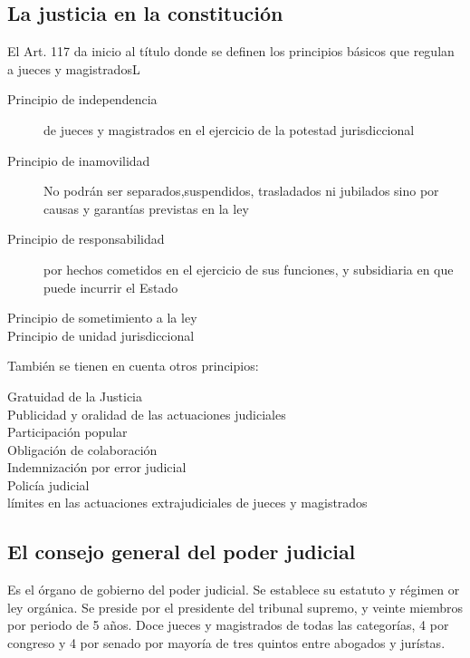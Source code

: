 \subsection{La justicia en la constitución} %
    El Art. 117 da inicio al título donde se definen los principios básicos que regulan a jueces y magistradosL
    \begin{description}
        \item[Principio de independencia] de jueces y magistrados en el ejercicio de la potestad jurisdiccional
        \item[Principio de inamovilidad] No podrán ser separados,suspendidos, trasladados ni jubilados sino por causas y garantías previstas en la ley
        \item[Principio de responsabilidad] por hechos cometidos en el ejercicio de sus funciones, y subsidiaria en que puede incurrir el Estado
        \item[Principio de sometimiento a la ley]
        \item[Principio de unidad jurisdiccional] 
    \end{description}

    También se tienen en cuenta otros principios:
    \begin{description}
        \item[Gratuidad de la Justicia]
        \item[Publicidad y oralidad de las actuaciones judiciales]
        \item[Participación popular]
        \item[Obligación de colaboración]
        \item[Indemnización por error judicial]
        \item[Policía judicial]
        \item[límites en las actuaciones extrajudiciales de jueces y magistrados]
    \end{description}

\subsection{El consejo general del poder judicial} %
    Es el órgano de gobierno del poder judicial. Se establece su estatuto y régimen or ley orgánica. Se preside por el presidente del tribunal supremo, y veinte miembros por periodo de 5 años. Doce jueces y magistrados de todas las categorías, 4 por congreso y 4 por senado por mayoría de tres quintos entre abogados y jurístas.

